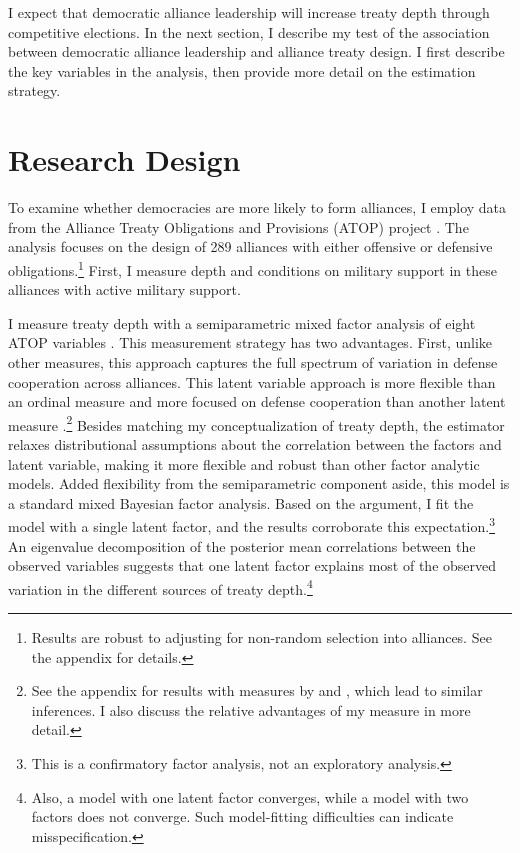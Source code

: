 \documentclass[12pt]{article}
\begin{document}
I expect that democratic alliance leadership will increase treaty depth through competitive elections. 
In the next section, I describe my test of the association between democratic alliance leadership and alliance treaty design. 
I first describe the key variables in the analysis, then provide more detail on the estimation strategy.



\section{Research Design}



To examine whether democracies are more likely to form alliances, I employ data from the Alliance Treaty Obligations and Provisions (ATOP) project \citep{Leedsetal2002}. 
The analysis focuses on the design of 289 alliances with either offensive or defensive obligations.\footnote{Results are robust to adjusting for non-random selection into alliances. See the appendix for details.}
First, I measure depth and conditions on military support in these alliances with active military support. 


I measure treaty depth with a semiparametric mixed factor analysis of eight ATOP variables \citep{Murrayetal2013}.
This measurement strategy has two advantages. 
First, unlike other measures, this approach captures the full spectrum of variation in defense cooperation across alliances.
This latent variable approach is more flexible than an ordinal measure \citep{LeedsAnac2005} and more focused on defense cooperation than another latent measure \citep{BensonClinton2016}.\footnote{See the appendix for results with measures by \citet{LeedsAnac2005} and \citet{BensonClinton2016}, which lead to similar inferences. I also discuss the relative advantages of my measure in more detail.}
Besides matching my conceptualization of treaty depth, the estimator relaxes distributional assumptions about the correlation between the factors and latent variable, making it more flexible and robust than other factor analytic models. 
Added flexibility from the semiparametric component aside, this model is a standard mixed Bayesian factor analysis. 
Based on the argument, I fit the model with a single latent factor, and the results corroborate this expectation.\footnote{This is a confirmatory factor analysis, not an exploratory analysis.}
An eigenvalue decomposition of the posterior mean correlations between the observed variables suggests that one latent factor explains most of the observed variation in the different sources of treaty depth.\footnote{Also, a model with one latent factor converges, while a model with two factors does not converge. Such model-fitting difficulties can indicate misspecification.} 
\end{document}
